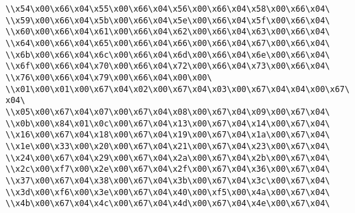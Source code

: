 \verb|\\x54\x00\x66\x04\x55\x00\x66\x04\x56\x00\x66\x04\x58\x00\x66\x04\|\newline
\verb|\\x59\x00\x66\x04\x5b\x00\x66\x04\x5e\x00\x66\x04\x5f\x00\x66\x04\|\newline
\verb|\\x60\x00\x66\x04\x61\x00\x66\x04\x62\x00\x66\x04\x63\x00\x66\x04\|\newline
\verb|\\x64\x00\x66\x04\x65\x00\x66\x04\x66\x00\x66\x04\x67\x00\x66\x04\|\newline
\verb|\\x6b\x00\x66\x04\x6c\x00\x66\x04\x6d\x00\x66\x04\x6e\x00\x66\x04\|\newline
\verb|\\x6f\x00\x66\x04\x70\x00\x66\x04\x72\x00\x66\x04\x73\x00\x66\x04\|\newline
\verb|\\x76\x00\x66\x04\x79\x00\x66\x04\x00\x00\|\newline
\verb|\\x01\x00\x01\x00\x67\x04\x02\x00\x67\x04\x03\x00\x67\x04\x04\x00\x67\x04\|\newline
\verb|\\x05\x00\x67\x04\x07\x00\x67\x04\x08\x00\x67\x04\x09\x00\x67\x04\|\newline
\verb|\\x0b\x00\x84\x01\x0c\x00\x67\x04\x13\x00\x67\x04\x14\x00\x67\x04\|\newline
\verb|\\x16\x00\x67\x04\x18\x00\x67\x04\x19\x00\x67\x04\x1a\x00\x67\x04\|\newline
\verb|\\x1e\x00\x33\x00\x20\x00\x67\x04\x21\x00\x67\x04\x23\x00\x67\x04\|\newline
\verb|\\x24\x00\x67\x04\x29\x00\x67\x04\x2a\x00\x67\x04\x2b\x00\x67\x04\|\newline
\verb|\\x2c\x00\xf7\x00\x2e\x00\x67\x04\x2f\x00\x67\x04\x36\x00\x67\x04\|\newline
\verb|\\x37\x00\x67\x04\x38\x00\x67\x04\x3b\x00\x67\x04\x3c\x00\x67\x04\|\newline
\verb|\\x3d\x00\xf6\x00\x3e\x00\x67\x04\x40\x00\xf5\x00\x4a\x00\x67\x04\|\newline
\verb|\\x4b\x00\x67\x04\x4c\x00\x67\x04\x4d\x00\x67\x04\x4e\x00\x67\x04\|\newline
